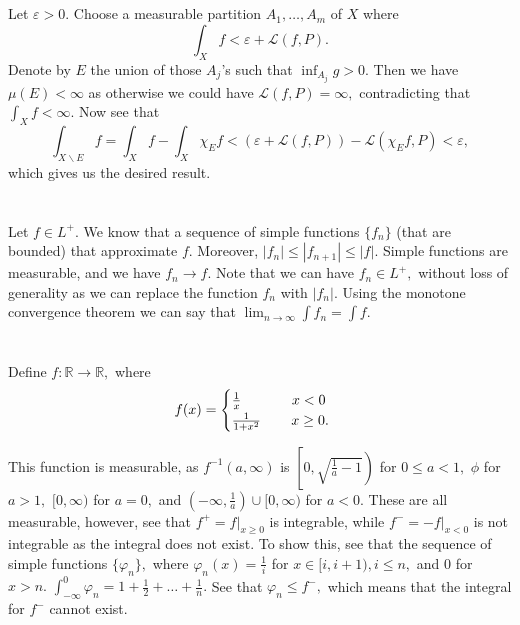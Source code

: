 \documentclass[]{article}
\begin{document}
	\section{} %
	Let $\varepsilon>0.$ Choose a measurable partition $A_1,\dots, A_m$ of $X$ where $$\int_{X}f < \varepsilon + \mathcal{L}(f,P). $$ 
	Denote by $E$ the union of those $A_j$'s such that $\inf_{A_j}g>0.$ Then we have $\mu(E)<\infty$ as otherwise we could have $\mathcal{L}(f,P)=\infty,$ contradicting that $\int_{X}f<\infty.$ Now see that $$\int_{X\backslash E}f = \int_{X}f - \int_{X}\chi_{E}f< (\varepsilon +\mathcal{L}(f,P)) - \mathcal{L}(\chi_{E}f,P)<\varepsilon,$$ which gives us the desired result. 
	\section{} %
	Let $f \in L^+$.  We know that a sequence of simple functions $\{f_n\}$ (that are bounded) that approximate $f.$ Moreover, $|f_n|\leq |f_{n+1}|\leq |f|.$ Simple functions are measurable, and we have $f_n \rightarrow f.$ Note that we can have $f_n \in L^+,$ without loss of generality as we can replace the function $f_n$ with $|f_n|$. Using the monotone convergence theorem we can say that $ \lim_{n \to \infty} \int f_n =\int f.$
	\section{} %
	Define $f: \mathbb{R} \rightarrow \mathbb{R},$ where $$f(x)= \begin{cases}		
	\frac{1}{x} \hspace{0.5 in} x<0\\
	\frac{1}{1+x^2} \hspace{0.3 in} x \geq 0.
	\end{cases} $$

This function is measurable, as $f^{-1}(a,\infty)$ is $ \left[0,\sqrt{\frac{1}{a}-1}\right)$ for $ 0 \leq a < 1,$ $ \phi$ for $ a>1,$ $[0,\infty)$ for $a=0,$ and $\left( -\infty,\frac{1}{a} \right) \cup [0,\infty)$ for $ a <0.$ These are all measurable, however, see that $f^+ = f|_{x \geq 0}$ is integrable, while $f^-=-f|_{x <0}$ is not integrable as the integral does not exist. To show this, see that the sequence of simple functions $\{\varphi_n\},$ where $\varphi_n(x)= \frac{1}{i}$ for $x \in [i,i+1), i \leq n, $ and $0$ for $x >n.$ $\int_{-\infty}^0 \varphi_n= 1+\frac{1}{2}+\dots+\frac{1}{n}.$ See that $\varphi_n \leq f^-,$ which means that the integral for $f^-$ cannot exist.   
\end{document}
